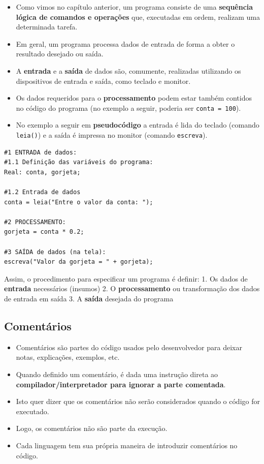 \documentclass[12pt,a4paper]{article}
\providecommand{\tightlist}{%
      \setlength{\itemsep}{0pt}\setlength{\parskip}{0pt}}
\begin{document}
    \begin{itemize}
\item
  Como vimos no capítulo anterior, um programa consiste de uma
  \textbf{sequência lógica de comandos e operações} que, executadas em
  ordem, realizam uma determinada tarefa.
\item
  Em geral, um programa processa dados de entrada de forma a obter o
  resultado desejado ou saída.
\item
  A \textbf{entrada} e a \textbf{saída} de dados são, comumente,
  realizadas utilizando os dispositivos de entrada e saída, como teclado
  e monitor.
\item
  Os dados requeridos para o \textbf{processamento} podem estar também
  contidos no código do programa (no exemplo a seguir, poderia ser
  \texttt{conta\ =\ 100}).
\item
  No exemplo a seguir em \textbf{pseudocódigo} a entrada é lida do
  teclado (comando \texttt{leia()}) e a saída é impressa no monitor
  (comando \texttt{escreva}).
\end{itemize}

    \begin{verbatim}
#1 ENTRADA de dados:
#1.1 Definição das variáveis do programa:
Real: conta, gorjeta;

#1.2 Entrada de dados
conta = leia("Entre o valor da conta: ");

#2 PROCESSAMENTO:
gorjeta = conta * 0.2;

#3 SAÍDA de dados (na tela):
escreva("Valor da gorjeta = " + gorjeta);
\end{verbatim}

    Assim, o procedimento para especificar um programa é definir: 1. Os
dados de \textbf{entrada} necessários (insumos) 2. O
\textbf{processamento} ou transformação dos dados de entrada em saída 3.
A \textbf{saída} desejada do programa

    \hypertarget{comentuxe1rios}{%
\subsection{Comentários}\label{comentuxe1rios}}

    \begin{itemize}
\tightlist
\item
  Comentários são partes do código usados pelo desenvolvedor para deixar
  notas, explicações, exemplos, etc.
\item
  Quando definido um comentário, é dada uma instrução direta ao
  \textbf{compilador/interpretador para ignorar a parte comentada}.
\item
  Isto quer dizer que os comentários não serão considerados quando o
  código for executado.
\item
  Logo, os comentários não são parte da execução.
\item
  Cada linguagem tem sua própria maneira de introduzir comentários no
  código.
\end{itemize}
\end{document}
